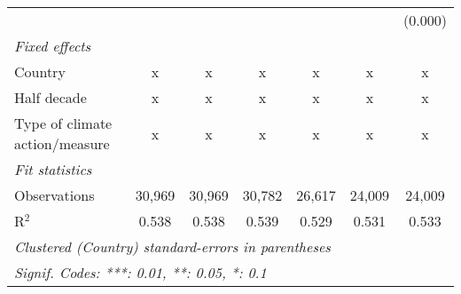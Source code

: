 \begin{tabular}{lcccccc}
                                                &              &              &               &               &               & (0.000)\\   
   \emph{Fixed effects}\\
   Country                                      & x            & x            & x             & x             & x             & x\\  
   Half decade                                  & x            & x            & x             & x             & x             & x\\  
   Type of climate action/measure               & x            & x            & x             & x             & x             & x\\  
   \midrule \emph{Fit statistics}\\
   Observations                                 & 30,969       & 30,969       & 30,782        & 26,617        & 24,009        & 24,009\\  
   R$^2$                                        & 0.538        & 0.538        & 0.539         & 0.529         & 0.531         & 0.533\\  
   \midrule
   \multicolumn{7}{l}{\emph{Clustered (Country) standard-errors in parentheses}}\\
   \multicolumn{7}{l}{\emph{Signif. Codes: ***: 0.01, **: 0.05, *: 0.1}}\\
\end{tabular}
\par\endgroup



